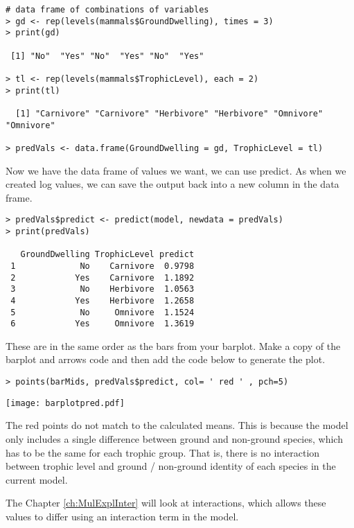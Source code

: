 \begin{lstlisting}
# data frame of combinations of variables
> gd <- rep(levels(mammals$GroundDwelling), times = 3)
> print(gd)

 [1] "No"  "Yes" "No"  "Yes" "No"  "Yes"
 
> tl <- rep(levels(mammals$TrophicLevel), each = 2)
> print(tl)

  [1] "Carnivore" "Carnivore" "Herbivore" "Herbivore" "Omnivore"  "Omnivore" 

> predVals <- data.frame(GroundDwelling = gd, TrophicLevel = tl)

\end{lstlisting}

Now we have the data frame of values we want, we can use predict. As 
when we created log values, we can save the output back into a new 
column in the data frame.

\begin{lstlisting}
> predVals$predict <- predict(model, newdata = predVals)
> print(predVals)

   GroundDwelling TrophicLevel predict
 1             No    Carnivore  0.9798
 2            Yes    Carnivore  1.1892
 3             No    Herbivore  1.0563
 4            Yes    Herbivore  1.2658
 5             No     Omnivore  1.1524
 6            Yes     Omnivore  1.3619
\end{lstlisting}

\begin{compactitem}[$\quad\star$]
	\item These are in the same order as the bars from your barplot. Make 
	a copy of the barplot and arrows code and then add the code below to 
	generate the plot. 
\end{compactitem}

\begin{lstlisting}
> points(barMids, predVals$predict, col= ' red ' , pch=5)
\end{lstlisting}

\begin{center}
	\texttt{[image: barplotpred.pdf]}
\end{center}

The red points do not match to the calculated means. This is because 
the model only includes a single difference between ground and 
non-ground species, which has to be the same for each trophic group. 
That is, there is no interaction between trophic level and ground / 
non-ground identity of each species in the current model.

The Chapter \ref{ch:MulExplInter} will look at interactions, which 
allows these values to differ using an interaction term in the model.
